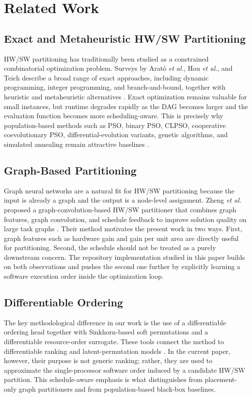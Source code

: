 \section{Related Work}
\label{sec:related}
\subsection{Exact and Metaheuristic HW/SW Partitioning}
HW/SW partitioning has traditionally been studied as a constrained combinatorial optimization problem. Surveys by Arat\'o \textit{et al.}, Hou \textit{et al.}, and Teich describe a broad range of exact approaches, including dynamic programming, integer programming, and branch-and-bound, together with heuristic and metaheuristic alternatives \cite{arato2005algorithmic,hou2019survey,teich2012hardware}. Exact optimization remains valuable for small instances, but runtime degrades rapidly as the DAG becomes larger and the evaluation function becomes more scheduling-aware. This is precisely why population-based methods such as PSO, binary PSO, CLPSO, cooperative coevolutionary PSO, differential-evolution variants, genetic algorithms, and simulated annealing remain attractive baselines \cite{kennedy1995particle,kennedy1997discrete,liang2006comprehensive,li2011cooperatively,tanabe2013success,zhang2009jade,garcia2008global,siarry1997enhanced}.

\subsection{Graph-Based Partitioning}
Graph neural networks are a natural fit for HW/SW partitioning because the input is already a graph and the output is a node-level assignment. Zheng \textit{et al.} proposed a graph-convolution-based HW/SW partitioner that combines graph features, graph convolution, and schedule feedback to improve solution quality on large task graphs \cite{zheng2021hardware}. Their method motivates the present work in two ways. First, graph features such as hardware gain and gain per unit area are directly useful for partitioning. Second, the schedule should not be treated as a purely downstream concern. The repository implementation studied in this paper builds on both observations and pushes the second one further by explicitly learning a software execution order inside the optimization loop.

\subsection{Differentiable Ordering}
The key methodological difference in our work is the use of a differentiable ordering head together with Sinkhorn-based soft permutations and a differentiable resource-order surrogate. These tools connect the method to differentiable ranking and latent-permutation models \cite{mena2018gumbel}. In the current paper, however, their purpose is not generic ranking; rather, they are used to approximate the single-processor software order induced by a candidate HW/SW partition. This schedule-aware emphasis is what distinguishes \diffgnnorder from placement-only graph partitioners and from population-based black-box baselines.

